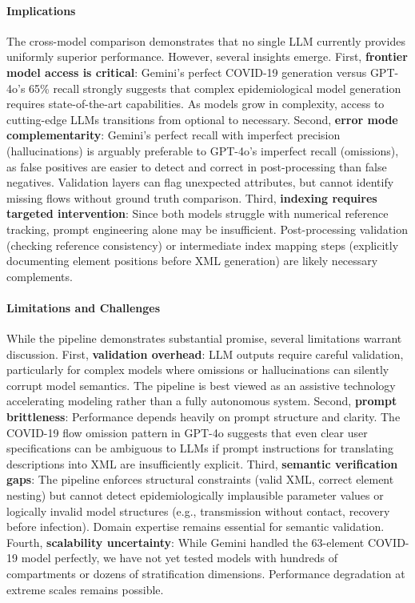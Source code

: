 \paragraph{Implications} The cross-model comparison demonstrates that no single LLM currently provides uniformly superior performance. However, several insights emerge. First, \textbf{frontier model access is critical}: Gemini's perfect COVID-19 generation versus GPT-4o's 65\% recall strongly suggests that complex epidemiological model generation requires state-of-the-art capabilities. As models grow in complexity, access to cutting-edge LLMs transitions from optional to necessary. Second, \textbf{error mode complementarity}: Gemini's perfect recall with imperfect precision (hallucinations) is arguably preferable to GPT-4o's imperfect recall (omissions), as false positives are easier to detect and correct in post-processing than false negatives. Validation layers can flag unexpected attributes, but cannot identify missing flows without ground truth comparison. Third, \textbf{indexing requires targeted intervention}: Since both models struggle with numerical reference tracking, prompt engineering alone may be insufficient. Post-processing validation (checking reference consistency) or intermediate index mapping steps (explicitly documenting element positions before XML generation) are likely necessary complements.

\paragraph{Limitations and Challenges} While the pipeline demonstrates substantial promise, several limitations warrant discussion. First, \textbf{validation overhead}: LLM outputs require careful validation, particularly for complex models where omissions or hallucinations can silently corrupt model semantics. The pipeline is best viewed as an assistive technology accelerating modeling rather than a fully autonomous system. Second, \textbf{prompt brittleness}: Performance depends heavily on prompt structure and clarity. The COVID-19 flow omission pattern in GPT-4o suggests that even clear user specifications can be ambiguous to LLMs if prompt instructions for translating descriptions into XML are insufficiently explicit. Third, \textbf{semantic verification gaps}: The pipeline enforces structural constraints (valid XML, correct element nesting) but cannot detect epidemiologically implausible parameter values or logically invalid model structures (e.g., transmission without contact, recovery before infection). Domain expertise remains essential for semantic validation. Fourth, \textbf{scalability uncertainty}: While Gemini handled the 63-element COVID-19 model perfectly, we have not yet tested models with hundreds of compartments or dozens of stratification dimensions. Performance degradation at extreme scales remains possible.

